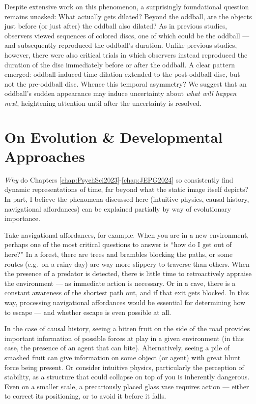 Despite extensive work on this phenomenon, a surprisingly foundational question remains unasked: What actually gets dilated? Beyond the oddball, are the objects just before (or just after) the oddball also dilated? As in previous studies, observers viewed sequences of colored discs, one of which could be the oddball --- and subsequently reproduced the oddball’s duration. Unlike previous studies, however, there were also critical trials in which observers instead reproduced the duration of the disc immediately before or after the oddball. A clear pattern emerged: oddball-induced time dilation extended to the post-oddball disc, but not the pre-oddball disc. Whence this temporal asymmetry? We suggest that an oddball’s sudden appearance may induce uncertainty about \textit{what will happen next}, heightening attention until after the uncertainty is resolved.



\section{On Evolution \& Developmental Approaches}

\textit{Why} do Chapters \ref{chap:PsychSci2023}-\ref{chap:JEPG2024} so consistently find dynamic representations of time, far beyond what the static image itself depicts?  In part, I believe the phenomena discussed here (intuitive physics, causal history, navigational affordances) can be explained partially by way of evolutionary importance.  

Take navigational affordances, for example.  When you are in a new environment, perhaps one of the most critical questions to answer is “how do I get out of here?”  In a forest, there are trees and brambles blocking the paths, or some routes (e.g.~on a rainy day) are way more slippery to traverse than others.  When the presence of a predator is detected, there is little time to retroactively appraise the environment --- as immediate action is necessary.  Or in a cave, there is a constant awareness of the shortest path out, and if that exit gets blocked.  In this way, processing navigational affordances would be essential for determining how to escape --- and whether escape is even possible at all. 

In the case of causal history, seeing a bitten fruit on the side of the road provides important information of possible forces at play in a given environment (in this case, the presence of an agent that can bite).  Alternatively, seeing a pile of smashed fruit can give information on some object (or agent) with great blunt force being present.  Or consider intuitive physics, particularly the perception of stability, as a structure that could collapse on top of you is inherently dangerous. Even on a smaller scale, a precariously placed glass vase requires action --- either to correct its positioning, or to avoid it before it falls.

